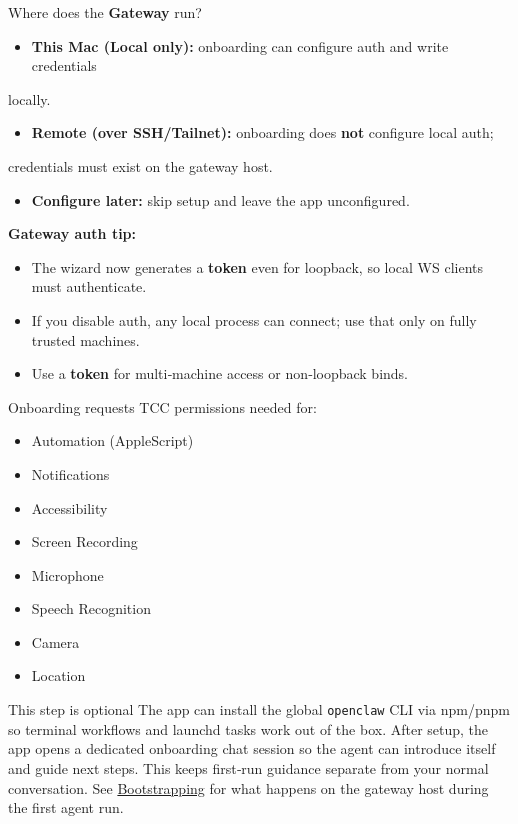 Where does the \textbf{Gateway} run?

\begin{itemize}
  \item \textbf{This Mac (Local only):} onboarding can configure auth and write credentials
\end{itemize}

locally.
\begin{itemize}
  \item \textbf{Remote (over SSH/Tailnet):} onboarding does \textbf{not} configure local auth;
\end{itemize}

credentials must exist on the gateway host.
\begin{itemize}
  \item \textbf{Configure later:} skip setup and leave the app unconfigured.
\end{itemize}


\textbf{Gateway auth tip:}

\begin{itemize}
  \item The wizard now generates a \textbf{token} even for loopback, so local WS clients must authenticate.
  \item If you disable auth, any local process can connect; use that only on fully trusted machines.
  \item Use a \textbf{token} for multi‑machine access or non‑loopback binds.
\end{itemize}



Onboarding requests TCC permissions needed for:

\begin{itemize}
  \item Automation (AppleScript)
  \item Notifications
  \item Accessibility
  \item Screen Recording
  \item Microphone
  \item Speech Recognition
  \item Camera
  \item Location
\end{itemize}


This step is optional
The app can install the global \texttt{openclaw} CLI via npm/pnpm so terminal
workflows and launchd tasks work out of the box.
After setup, the app opens a dedicated onboarding chat session so the agent can
introduce itself and guide next steps. This keeps first‑run guidance separate
from your normal conversation. See \href{/start/bootstrapping}{Bootstrapping} for
what happens on the gateway host during the first agent run.


